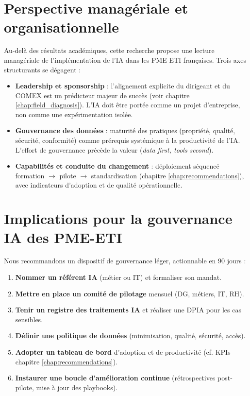 \section{Perspective managériale et organisationnelle}
Au-delà des résultats académiques, cette recherche propose une lecture managériale de l'implémentation de l'IA dans les PME-ETI françaises. Trois axes structurants se dégagent :
\begin{itemize}
    \item \textbf{Leadership et sponsorship} : l’alignement explicite du dirigeant et du COMEX est un prédicteur majeur de succès (voir chapitre \ref{chap:field_diagnosis}). L’IA doit être portée comme un projet d’entreprise, non comme une expérimentation isolée.
    \item \textbf{Gouvernance des données} : maturité des pratiques (propriété, qualité, sécurité, conformité) comme prérequis systémique à la productivité de l'IA. L’effort de gouvernance précède la valeur (\emph{data first, tools second}).
    \item \textbf{Capabilités et conduite du changement} : déploiement séquencé formation $\rightarrow$ pilote $\rightarrow$ standardisation (chapitre \ref{chap:recommendations}), avec indicateurs d’adoption et de qualité opérationnelle.
\end{itemize}

\section{Implications pour la gouvernance IA des PME-ETI}
Nous recommandons un dispositif de gouvernance léger, actionnable en 90 jours :
\begin{enumerate}
    \item \textbf{Nommer un référent IA} (métier ou IT) et formaliser son mandat.
    \item \textbf{Mettre en place un comité de pilotage} mensuel (DG, métiers, IT, RH).
    \item \textbf{Tenir un registre des traitements IA} et réaliser une DPIA pour les cas sensibles.
    \item \textbf{Définir une politique de données} (minimisation, qualité, sécurité, accès).
    \item \textbf{Adopter un tableau de bord} d’adoption et de productivité (cf. KPIs chapitre \ref{chap:recommendations}).
    \item \textbf{Instaurer une boucle d’amélioration continue} (rétrospectives post-pilote, mise à jour des playbooks).
\end{enumerate}

